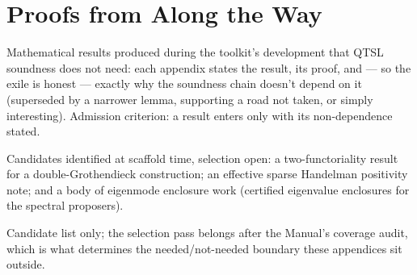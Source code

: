 \chapter{Proofs from Along the Way}
\label{ch:appendices}

\stubbanner

\stubplan Mathematical results produced during the toolkit's
development that QTSL soundness does not need: each appendix states
the result, its proof, and --- so the exile is honest --- exactly why
the soundness chain doesn't depend on it (superseded by a narrower
lemma, supporting a road not taken, or simply interesting). Admission
criterion: a result enters only with its non-dependence stated.

\stubmaterial Candidates identified at scaffold time, selection open: a
two-functoriality result for a double-Grothendieck construction; an
effective sparse Handelman positivity note; and a body of eigenmode
enclosure work (certified eigenvalue enclosures for the spectral
proposers).

\stubstatus Candidate list only; the selection pass belongs after the
Manual's coverage audit, which is what determines the
needed/not-needed boundary these appendices sit outside.

